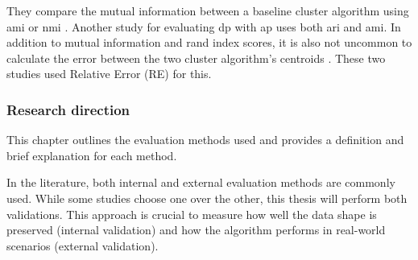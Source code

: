 They compare the mutual information between a baseline cluster algorithm using \gls{ami} \citep{9679364} or \gls{nmi} \citep{xia_distributed_2020,sun_privbv_2022}.
Another study for evaluating \gls{dp} with \gls{ap} uses both \gls{ari} and \gls{ami}.
In addition to mutual information and rand index scores, it is also not uncommon to calculate the error between the two cluster algorithm's centroids \citep{xia_distributed_2020, 9679364}.
These two studies used Relative Error (RE) for this.

\subsubsection{Research direction}
This chapter outlines the evaluation methods used and provides a definition and brief explanation for each method.

In the literature, both internal and external evaluation methods are commonly used.
While some studies choose one over the other, this thesis will perform both validations.
This approach is crucial to measure how well the data shape is preserved (internal validation) and how the algorithm performs in real-world scenarios (external validation).


